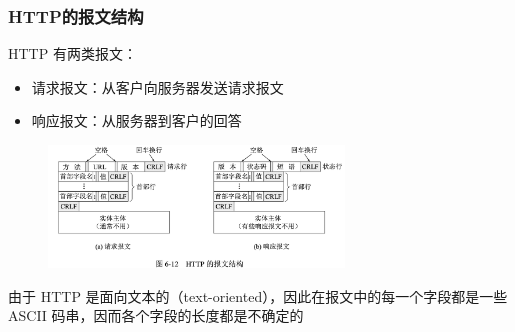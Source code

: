 \documentclass[cs4size,a4paper,10pt]{ctexart}
\begin{document}
	\subsubsection{HTTP的报文结构}
	HTTP 有两类报文：
	\begin{itemize}
		\item 请求报文：从客户向服务器发送请求报文
		\item 响应报文：从服务器到客户的回答
	\end{itemize}

	\begin{figure}[H]
		\centering
		\includegraphics[width=0.7\textwidth]{img/6.12}
	\end{figure}

	由于 HTTP 是面向文本的（text-oriented），因此在报文中的每一个字段都是一些 ASCII 码串，因而各个字段的长度都是不确定的
\end{document}
